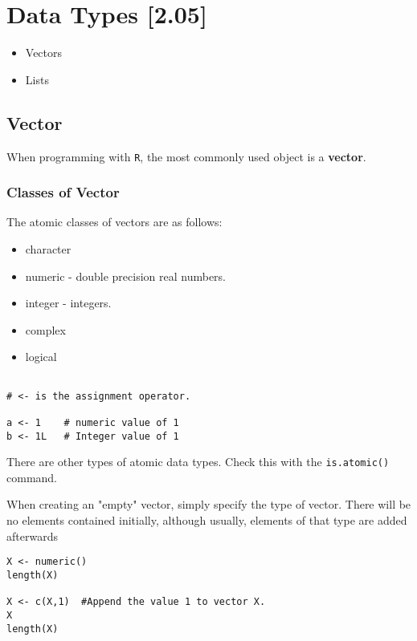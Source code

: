 \section*{Data Types [2.05]}

\begin{itemize}
\item Vectors
\item Lists
\end{itemize}

\subsection*{Vector}
When programming with \texttt{R}, the most commonly used object is a \textbf{vector}.

\subsubsection*{Classes of Vector}
The atomic classes of vectors are as follows:
\begin{itemize}
\item character
\item numeric - double precision real numbers.
\item integer - integers.
\item complex
\item logical
\end{itemize}
\begin{framed}
\begin{verbatim}

# <- is the assignment operator.

a <- 1    # numeric value of 1
b <- 1L   # Integer value of 1
\end{verbatim}
\end{framed}


There are other types of atomic data types. Check this with the \texttt{is.atomic()} command.


When creating an "empty" vector, simply specify the type of vector. There will be no elements contained initially, although usually, elements of that type are added afterwards

\begin{framed}
\begin{verbatim}
X <- numeric()
length(X)

X <- c(X,1)  #Append the value 1 to vector X.
X
length(X)

\end{verbatim}
\end{framed}


